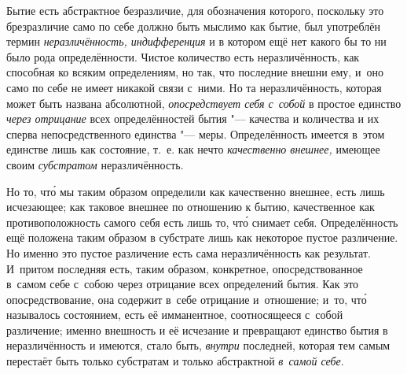 
Бытие есть абстрактное безразличие, для обозначения которого, поскольку это
брезразличие само по себе должно быть мыслимо как бытие, был употреблён
термин {\em неразличённость, индифференция}
и в котором ещё нет какого бы то ни было рода определённости. Чистое количество
есть неразличённость, как способная ко всяким определениям, но так, что
последние внешни ему, и~оно само по себе не имеет никакой связи с~ними. Но та
неразличённость, которая может быть названа абсолютной, {\em опосредствует себя
с~собой} в простое единство {\em через отрицание} всех определённостей бытия
"--- качества и количества и их сперва непосредственного единства "--- меры.
Определённость имеется в~этом единстве лишь как состояние, т.~е. как нечто
{\em качественно внешнее,} имеющее своим {\em субстратом} неразличённость.

Но то, чт\'{о} мы таким образом определили как качественно внешнее, есть лишь
исчезающее; как таковое внешнее по отношению к бытию, качественное как
противоположность самого себя есть лишь то, чт\'{о} снимает себя.
Определённость ещё положена таким образом в субстрате лишь как некоторое пустое
различение. Но именно это пустое различение есть сама неразличённость
как результат. И~притом последняя есть, таким образом, конкретное,
опосредствованное в~самом себе с~собою через отрицание всех определений бытия.
Как это опосредствование, она содержит в~себе отрицание и~отношение; и~то,
чт\'{о} называлось состоянием, есть её имманентное, соотносящееся с~собой
различение; именно внешность и её исчезание и превращают единство бытия
в неразличённость и имеются, стало быть, {\em внутри} последней, которая тем
самым перестаёт быть только субстратам и только абстрактной {\em в~самой себе}.

